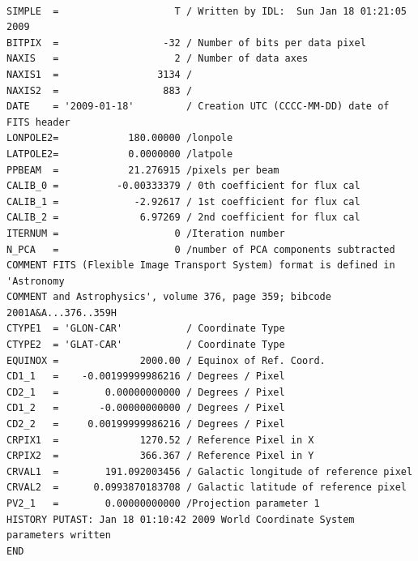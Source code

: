 \documentclass[12pt,preprint]{aastex}
\begin{document}
\begin{verbatim}

SIMPLE  =                    T / Written by IDL:  Sun Jan 18 01:21:05 2009      
BITPIX  =                  -32 / Number of bits per data pixel                  
NAXIS   =                    2 / Number of data axes                            
NAXIS1  =                 3134 /                                                
NAXIS2  =                  883 /                                                
DATE    = '2009-01-18'         / Creation UTC (CCCC-MM-DD) date of FITS header  
LONPOLE2=            180.00000 /lonpole                                         
LATPOLE2=            0.0000000 /latpole                                         
PPBEAM  =            21.276915 /pixels per beam                                 
CALIB_0 =          -0.00333379 / 0th coefficient for flux cal                   
CALIB_1 =             -2.92617 / 1st coefficient for flux cal                   
CALIB_2 =              6.97269 / 2nd coefficient for flux cal                   
ITERNUM =                    0 /Iteration number                                
N_PCA   =                    0 /number of PCA components subtracted             
COMMENT FITS (Flexible Image Transport System) format is defined in 'Astronomy  
COMMENT and Astrophysics', volume 376, page 359; bibcode 2001A&A...376..359H    
CTYPE1  = 'GLON-CAR'           / Coordinate Type                                
CTYPE2  = 'GLAT-CAR'           / Coordinate Type                                
EQUINOX =              2000.00 / Equinox of Ref. Coord.                         
CD1_1   =    -0.00199999986216 / Degrees / Pixel                                
CD2_1   =        0.00000000000 / Degrees / Pixel                                
CD1_2   =       -0.00000000000 / Degrees / Pixel                                
CD2_2   =     0.00199999986216 / Degrees / Pixel                                
CRPIX1  =              1270.52 / Reference Pixel in X                           
CRPIX2  =              366.367 / Reference Pixel in Y                           
CRVAL1  =        191.092003456 / Galactic longitude of reference pixel          
CRVAL2  =      0.0993870183708 / Galactic latitude of reference pixel           
PV2_1   =        0.00000000000 /Projection parameter 1                          
HISTORY PUTAST: Jan 18 01:10:42 2009 World Coordinate System parameters written 
END                                                                             

\end{verbatim}


\end{document}
